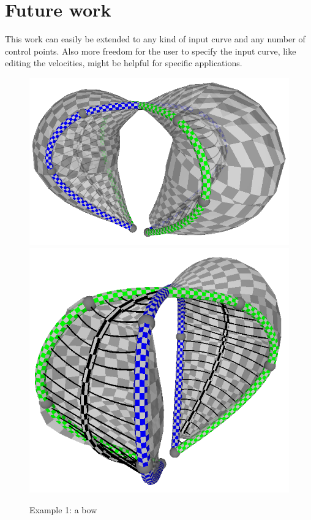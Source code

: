 \documentclass[journal, letterpaper]{IEEEtran}
\begin{document}
\section{Future work}
This work can easily be extended to any kind of input curve and any number of control points.
Also more freedom for the user to specify the input curve, like editing the velocities, might be helpful for specific applications.

\begin{figure}
	\centering
		\includegraphics[scale=0.5]{images/Result1.png}
		\includegraphics[scale=0.5]{images/Result2.png}
	\caption{Example 1: a bow}
	\label{fig:Result1}
\end{figure}
\end{document}
